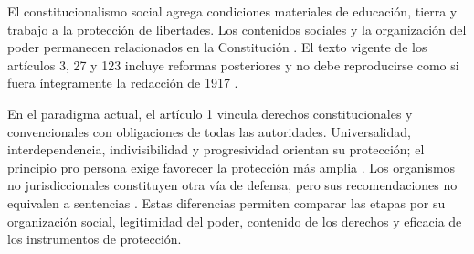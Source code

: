 \documentclass[12pt,spanish,letterpaper,oneside]{article}
\begin{document}
El constitucionalismo social agrega condiciones materiales de educaci\'on,
tierra y trabajo a la protecci\'on de libertades. Los contenidos sociales
y la organizaci\'on del poder permanecen relacionados en la Constituci\'on
\citep[p.~2]{arteaga}. El texto vigente de los art\'iculos 3, 27 y 123
incluye reformas posteriores y no debe reproducirse como si fuera
\'integramente la redacci\'on de 1917 \citep{cpeum2026}.

En el paradigma actual, el art\'iculo 1 vincula derechos constitucionales
y convencionales con obligaciones de todas las autoridades. Universalidad,
interdependencia, indivisibilidad y progresividad orientan su protecci\'on;
el principio pro persona exige favorecer la protecci\'on m\'as amplia
\citep[art.~1]{cpeum2026}. Los organismos no jurisdiccionales constituyen
otra v\'ia de defensa, pero sus recomendaciones no equivalen a sentencias
\citep[pp.~47--48]{alvarez2009}. Estas diferencias permiten comparar las
etapas por su organizaci\'on social, legitimidad del poder, contenido de
los derechos y eficacia de los instrumentos de protecci\'on.
\end{document}

